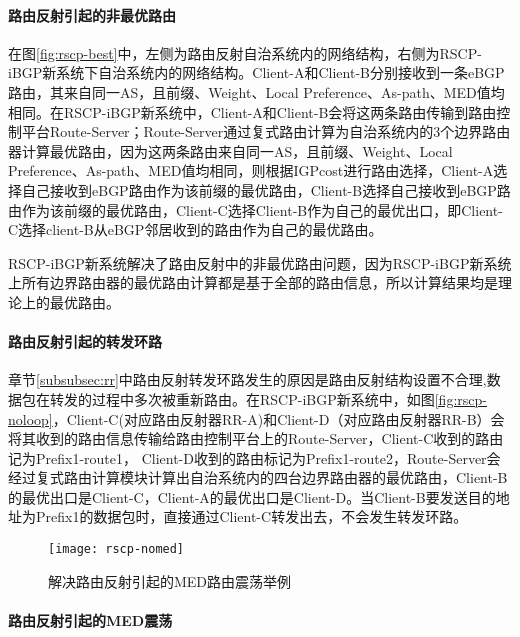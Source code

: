 \paragraph{路由反射引起的非最优路由}
在图\ref{fig:rscp-best}中，左侧为路由反射自治系统内的网络结构，右侧为RSCP-iBGP新系统下自治系统内的网络结构。Client-A和Client-B分别接收到一条eBGP路由，其来自同一AS，且前缀、Weight、Local Preference、As-path、MED值均相同。在RSCP-iBGP新系统中，Client-A和Client-B会将这两条路由传输到路由控制平台Route-Server；Route-Server通过复式路由计算为自治系统内的3个边界路由器计算最优路由，因为这两条路由来自同一AS，且前缀、Weight、Local Preference、As-path、MED值均相同，则根据IGPcost进行路由选择，Client-A选择自己接收到eBGP路由作为该前缀的最优路由，Client-B选择自己接收到eBGP路由作为该前缀的最优路由，Client-C选择Client-B作为自己的最优出口，即Client-C选择client-B从eBGP邻居收到的路由作为自己的最优路由。

RSCP-iBGP新系统解决了路由反射中的非最优路由问题，因为RSCP-iBGP新系统上所有边界路由器的最优路由计算都是基于全部的路由信息，所以计算结果均是理论上的最优路由。\\


\paragraph{路由反射引起的转发环路}

章节\ref{subsubsec:rr}中路由反射转发环路发生的原因是路由反射结构设置不合理,数据包在转发的过程中多次被重新路由。在RSCP-iBGP新系统中，如图\ref{fig:rscp-noloop}，Client-C(对应路由反射器RR-A)和Client-D（对应路由反射器RR-B）会将其收到的路由信息传输给路由控制平台上的Route-Server，Client-C收到的路由记为Prefix1-route1， Client-D收到的路由标记为Prefix1-route2，Route-Server会经过复式路由计算模块计算出自治系统内的四台边界路由器的最优路由，Client-B的最优出口是Client-C，Client-A的最优出口是Client-D。当Client-B要发送目的地址为Prefix1的数据包时，直接通过Client-C转发出去，不会发生转发环路。\\

\begin{figure}
  \centering
  \texttt{[image: rscp-nomed]}
  \caption{解决路由反射引起的MED路由震荡举例}
  \label{fig:rscp-nomed}
\end{figure}


\paragraph{路由反射引起的MED震荡}

